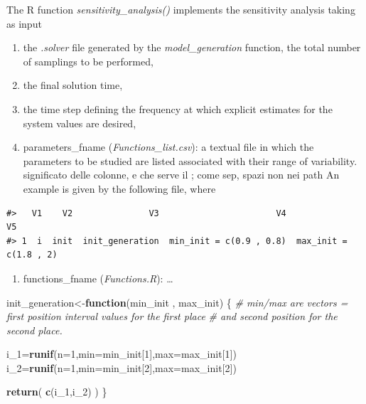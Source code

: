 \documentclass[
]{article}
\newenvironment{Shaded}{\begin{snugshade}}{\end{snugshade}}
\newcommand{\CommentTok}[1]{\textcolor[rgb]{0.56,0.35,0.01}{\textit{#1}}}
\newcommand{\ControlFlowTok}[1]{\textcolor[rgb]{0.13,0.29,0.53}{\textbf{#1}}}
\newcommand{\DataTypeTok}[1]{\textcolor[rgb]{0.13,0.29,0.53}{#1}}
\newcommand{\DecValTok}[1]{\textcolor[rgb]{0.00,0.00,0.81}{#1}}
\newcommand{\KeywordTok}[1]{\textcolor[rgb]{0.13,0.29,0.53}{\textbf{#1}}}
\newcommand{\NormalTok}[1]{#1}
\providecommand{\tightlist}{%
  \setlength{\itemsep}{0pt}\setlength{\parskip}{0pt}}
\begin{document}
The R function \emph{sensitivity\_analysis()} implements the sensitivity
analysis taking as input

\begin{enumerate}
\def\labelenumi{\arabic{enumi}.}
\tightlist
\item
  the \emph{.solver} file generated by the \emph{model\_generation}
  function, the total number of samplings to be performed,
\item
  the final solution time,
\item
  the time step defining the frequency at which explicit estimates for
  the system values are desired,
\item
  parameters\_fname (\emph{Functions\_list.csv}): a textual file in
  which the parameters to be studied are listed associated with their
  range of variability. significato delle colonne, e che serve il ; come
  sep, spazi non nei path An example is given by the following file,
  where
\end{enumerate}

\begin{verbatim}
#>   V1    V2               V3                       V4                     V5
#> 1  i  init  init_generation  min_init = c(0.9 , 0.8)  max_init = c(1.8 , 2)
\end{verbatim}

\begin{enumerate}
\def\labelenumi{\arabic{enumi}.}
\setcounter{enumi}{4}
\tightlist
\item
  functions\_fname (\emph{Functions.R}): \ldots{}
\end{enumerate}

\begin{Shaded}
\begin{Highlighting}[]
\NormalTok{init_generation<-}\ControlFlowTok{function}\NormalTok{(min_init , max_init)}
\NormalTok{\{}
    \CommentTok{# min/max are vectors = first position interval values for the first place}
    \CommentTok{# and second position for the second place.}

\NormalTok{   i_}\DecValTok{1}\NormalTok{=}\KeywordTok{runif}\NormalTok{(}\DataTypeTok{n=}\DecValTok{1}\NormalTok{,}\DataTypeTok{min=}\NormalTok{min_init[}\DecValTok{1}\NormalTok{],}\DataTypeTok{max=}\NormalTok{max_init[}\DecValTok{1}\NormalTok{])}
\NormalTok{   i_}\DecValTok{2}\NormalTok{=}\KeywordTok{runif}\NormalTok{(}\DataTypeTok{n=}\DecValTok{1}\NormalTok{,}\DataTypeTok{min=}\NormalTok{min_init[}\DecValTok{2}\NormalTok{],}\DataTypeTok{max=}\NormalTok{max_init[}\DecValTok{2}\NormalTok{])}

   \KeywordTok{return}\NormalTok{( }\KeywordTok{c}\NormalTok{(i_}\DecValTok{1}\NormalTok{,i_}\DecValTok{2}\NormalTok{) )}
\NormalTok{\}}
\end{Highlighting}
\end{Shaded}
\end{document}
